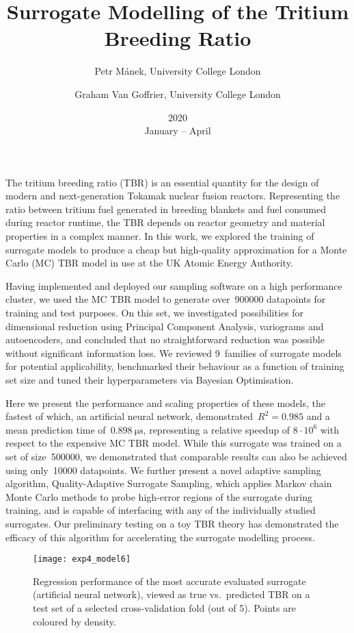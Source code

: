 \documentclass{article}
\title{Surrogate Modelling of the Tritium Breeding Ratio}
\date{2020\\ January -- April}
\author{
	Petr Mánek, University College London\\
	\and Graham Van Goffrier, University College London
}
\begin{document}
\maketitle
\thispagestyle{empty}

The tritium breeding ratio (TBR) is an essential quantity for the design of
modern and next-generation Tokamak nuclear fusion reactors. Representing the
ratio between tritium fuel generated in breeding blankets and fuel consumed
during reactor runtime, the TBR depends on reactor geometry and material
properties in a complex manner. In this work, we explored the
training of surrogate models to produce a cheap but high-quality approximation
for a Monte Carlo (MC) TBR model in use at the UK Atomic Energy Authority.

Having implemented and deployed our sampling software on a high performance cluster, we
used the MC TBR model to generate over~\num{900000} datapoints for training and
test purposes. On this set, we investigated possibilities for
dimensional reduction using Principal Component Analysis, variograms and
autoencoders, and concluded that no straightforward reduction was possible
without significant information loss. We reviewed 9~families of surrogate models for potential
applicability, benchmarked their behaviour as a function of training set size and tuned their
hyperparameters via Bayesian Optimisation.

Here we present the performance and scaling properties of these
models, the fastest of which, an artificial neural network,
demonstrated~$R^2=\num{0.985}$ and a mean
prediction time of~$\SI{0.898}{\micro\second}$, representing a relative speedup of $8\cdot 10^6$
with respect to the expensive MC TBR model. While this surrogate was trained on
a set of size~\num{500000}, we demonstrated that comparable results can also be
achieved using only~\num{10000} datapoints. We further present a novel adaptive
sampling algorithm, Quality-Adaptive Surrogate Sampling, which applies Markov chain Monte Carlo methods to probe high-error regions of the surrogate during training, and is capable
of interfacing with any of the individually studied surrogates. Our preliminary
testing on a toy TBR theory has demonstrated the efficacy of this algorithm for
accelerating the surrogate modelling process.

\begin{figure}[h]
	\centering
	\texttt{[image: exp4\_model6]}
	\caption{Regression performance of the most accurate evaluated surrogate
		(artificial neural network), viewed as true vs.~predicted TBR on a test
		set of a selected cross-validation fold (out of 5). Points are coloured by density.}
\end{figure}
\end{document}
